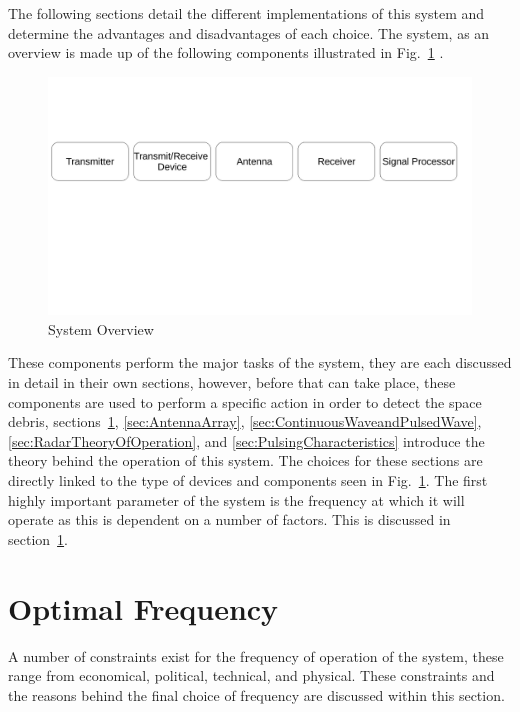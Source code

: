 \documentclass[11pt]{witseiepaper}
\begin{document}
The following sections detail the different implementations of this system and determine the advantages and disadvantages of each choice.
The system, as an overview is made up of the following components illustrated in Fig.~\ref{fig:SystemOverview} \cite{radarHandbook}.

\begin{center}
    \begin{figure}
        \includegraphics[width=\textwidth]{SystemOverview.pdf}
        \caption{System Overview}
        \label{fig:SystemOverview}    
    \end{figure}
\end{center}

These components perform the major tasks of the system, they are each discussed in detail in their own sections, however, before that can take place, these components are used to perform a specific action in order to detect the space debris, sections~\ref{sec:OptimalFrequency}, \ref{sec:AntennaArray}, \ref{sec:ContinuousWaveandPulsedWave}, \ref{sec:RadarTheoryOfOperation}, and \ref{sec:PulsingCharacteristics} introduce the theory behind the operation of this system. The choices for these sections are directly linked to the type of devices and components seen in Fig.~\ref{fig:SystemOverview}.
The first highly important parameter of the system is the frequency at which it will operate as this is dependent on a number of factors. This is discussed in section~\ref{sec:OptimalFrequency}.


\section{Optimal Frequency} \label{sec:OptimalFrequency}
A number of constraints exist for the frequency of operation of the system, these range from economical, political, technical, and physical. These constraints and the reasons behind the final choice of frequency are discussed within this section.
\end{document}
